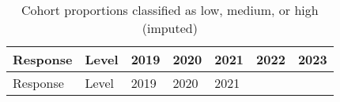 \documentclass[
  single column]{article}
\begin{document}
\begin{longtable}[]{@{}
  >{\raggedright\arraybackslash}p{}
  >{\raggedright\arraybackslash}p{}
  >{\raggedright\arraybackslash}p{}
  >{\raggedright\arraybackslash}p{}
  >{\raggedright\arraybackslash}p{}
  >{\raggedright\arraybackslash}p{}
  >{\raggedright\arraybackslash}p{}@{}}
\caption{Cohort proportions classified as low, medium, or high
(imputed)}\label{tbl-sample-cat-imp}\tabularnewline
\toprule\noalign{}
\begin{minipage}[b]{\linewidth}\raggedright
Response
\end{minipage} & \begin{minipage}[b]{\linewidth}\raggedright
Level
\end{minipage} & \begin{minipage}[b]{\linewidth}\raggedright
2019
\end{minipage} & \begin{minipage}[b]{\linewidth}\raggedright
2020
\end{minipage} & \begin{minipage}[b]{\linewidth}\raggedright
2021
\end{minipage} & \begin{minipage}[b]{\linewidth}\raggedright
2022
\end{minipage} & \begin{minipage}[b]{\linewidth}\raggedright
2023
\end{minipage} \\
\midrule\noalign{}
\endfirsthead
\toprule\noalign{}
\begin{minipage}[b]{\linewidth}\raggedright
Response
\end{minipage} & \begin{minipage}[b]{\linewidth}\raggedright
Level
\end{minipage} & \begin{minipage}[b]{\linewidth}\raggedright
2019
\end{minipage} & \begin{minipage}[b]{\linewidth}\raggedright
2020
\end{minipage} & \begin{minipage}[b]{\linewidth}\raggedright
2021
\end{minipage} & \begin{minipage}[b]{\linewidth}\raggedright

\end{minipage}
\end{longtable}
\end{document}
